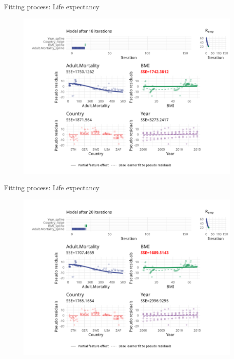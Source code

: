 \begin{frame}{Fitting process: Life expectancy}
	\begin{figure}
		\centering
		\includegraphics[width=\textwidth]{figures/cwb-anim/fig-iter-0018.png}
	\end{figure}
	\addtocounter{framenumber}{-1}
\end{frame}


\begin{frame}{Fitting process: Life expectancy}
	\begin{figure}
		\centering
		\includegraphics[width=\textwidth]{figures/cwb-anim/fig-iter-0020.png}
	\end{figure}
	\addtocounter{framenumber}{-1}
\end{frame}


